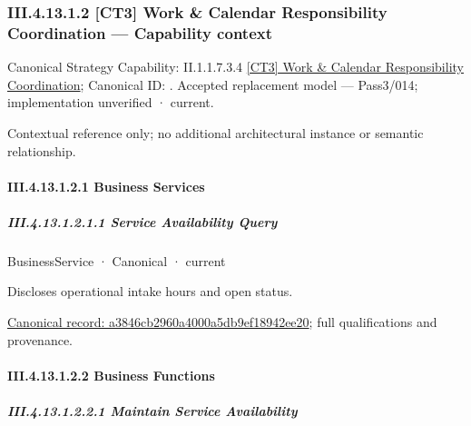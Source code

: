 \subsubsection*{III.4.13.1.2 [CT3] Work \& Calendar Responsibility Coordination — Capability context}
\label{navigation:III.4.13.1.2}

{\small Canonical Strategy Capability: II.1.1.7.3.4 \hyperref[element:8ead6499039b4a9ea14beeae7d0ff6f4]{[CT3] Work \& Calendar Responsibility Coordination}; Canonical ID: \texttt{}. Accepted replacement model — Pass3/014; implementation unverified · current.}\par
Contextual reference only; no additional architectural instance or semantic relationship.\par
\paragraph*{III.4.13.1.2.1 Business Services}
\label{navigation:III.4.13.1.2.1}

\subparagraph*{III.4.13.1.2.1.1 Service Availability Query}
\label{navigation:III.4.13.1.2.1.1}

\label{element:a3846cb2960a4000a5db9ef18942ee20}
{\small BusinessService · Canonical · current}\par

Discloses operational intake hours and open status.


{\footnotesize \href{../../../../../../../../continuum/business/business-service/a3846cb2960a4000a5db9ef18942ee20.md}{Canonical record: a3846cb2960a4000a5db9ef18942ee20}; full qualifications and provenance.}\par
\paragraph*{III.4.13.1.2.2 Business Functions}
\label{navigation:III.4.13.1.2.2}

\subparagraph*{III.4.13.1.2.2.1 Maintain Service Availability}
\label{navigation:III.4.13.1.2.2.1}

